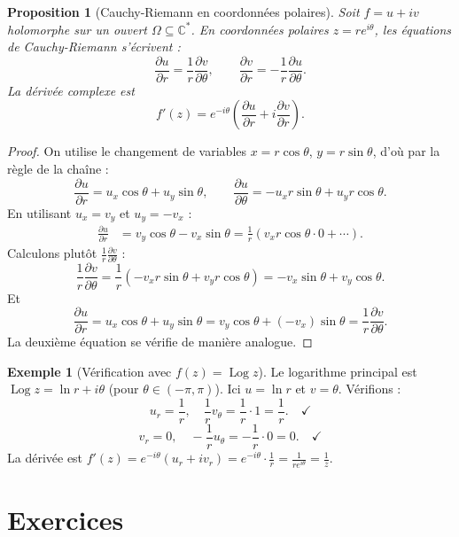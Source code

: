 \documentclass[12pt,a4paper,openany]{book}
\theoremstyle{definition}
\newtheorem{exemple}[definition]{Exemple}
\theoremstyle{plain}
\newtheorem{proposition}[definition]{Proposition}
\theoremstyle{remark}
\newcommand{\C}{\mathbb{C}}
\DeclareMathOperator{\Log}{Log}
\begin{document}
\begin{proposition}[Cauchy-Riemann en coordonnées polaires]\label{prop:CR-polaires}
Soit $f = u + iv$ holomorphe sur un ouvert $\Omega \subseteq \C^*$. En coordonnées polaires $z = re^{i\theta}$, les équations de Cauchy-Riemann s'écrivent :
\begin{equation}\label{eq:CR-polaires}
  \frac{\partial u}{\partial r} = \frac{1}{r}\frac{\partial v}{\partial \theta}, \qquad
  \frac{\partial v}{\partial r} = -\frac{1}{r}\frac{\partial u}{\partial \theta}.
\end{equation}
La dérivée complexe est
\[
  f'(z) = e^{-i\theta}\left(\frac{\partial u}{\partial r} + i\frac{\partial v}{\partial r}\right).
\]
\end{proposition}

\begin{proof}
On utilise le changement de variables $x = r\cos\theta$, $y = r\sin\theta$, d'où par la règle de la chaîne :
\[
  \frac{\partial u}{\partial r} = u_x \cos\theta + u_y \sin\theta, \qquad
  \frac{\partial u}{\partial \theta} = -u_x r\sin\theta + u_y r\cos\theta.
\]
En utilisant $u_x = v_y$ et $u_y = -v_x$ :
\begin{align*}
  \frac{\partial u}{\partial r} &= v_y\cos\theta - v_x\sin\theta = \frac{1}{r}\left(v_x r\cos\theta \cdot 0 + \cdots\right).
\end{align*}
Calculons plutôt $\frac{1}{r}\frac{\partial v}{\partial\theta}$ :
\[
  \frac{1}{r}\frac{\partial v}{\partial \theta} = \frac{1}{r}\left(-v_x r\sin\theta + v_y r\cos\theta\right) = -v_x\sin\theta + v_y\cos\theta.
\]
Et
\[
  \frac{\partial u}{\partial r} = u_x\cos\theta + u_y\sin\theta = v_y\cos\theta + (-v_x)\sin\theta = \frac{1}{r}\frac{\partial v}{\partial\theta}.
\]
La deuxième équation se vérifie de manière analogue.
\end{proof}

\begin{exemple}[Vérification avec $f(z) = \Log z$]\label{ex:CR-polaires-log}
Le logarithme principal est $\Log z = \ln r + i\theta$ (pour $\theta \in (-\pi,\pi)$). Ici $u = \ln r$ et $v = \theta$. Vérifions :
\[
  u_r = \frac{1}{r}, \quad \frac{1}{r}v_\theta = \frac{1}{r}\cdot 1 = \frac{1}{r}. \quad \checkmark
\]
\[
  v_r = 0, \quad -\frac{1}{r}u_\theta = -\frac{1}{r}\cdot 0 = 0. \quad \checkmark
\]
La dérivée est $f'(z) = e^{-i\theta}(u_r + iv_r) = e^{-i\theta}\cdot\frac{1}{r} = \frac{1}{re^{i\theta}} = \frac{1}{z}$.
\end{exemple}

\section{Exercices}\label{sec:exo-ch2}
\end{document}
